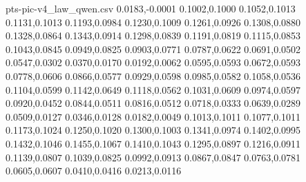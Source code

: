 \begin{filecontents*}[overwrite]{pts-pic-v4_law_qwen.csv}
0.0183,-0.0001
0.1002,0.1000
0.1052,0.1013
0.1131,0.1013
0.1193,0.0984
0.1230,0.1009
0.1261,0.0926
0.1308,0.0880
0.1328,0.0864
0.1343,0.0914
0.1298,0.0839
0.1191,0.0819
0.1115,0.0853
0.1043,0.0845
0.0949,0.0825
0.0903,0.0771
0.0787,0.0622
0.0691,0.0502
0.0547,0.0302
0.0370,0.0170
0.0192,0.0062
0.0595,0.0593
0.0672,0.0593
0.0778,0.0606
0.0866,0.0577
0.0929,0.0598
0.0985,0.0582
0.1058,0.0536
0.1104,0.0599
0.1142,0.0649
0.1118,0.0562
0.1031,0.0609
0.0974,0.0597
0.0920,0.0452
0.0844,0.0511
0.0816,0.0512
0.0718,0.0333
0.0639,0.0289
0.0509,0.0127
0.0346,0.0128
0.0182,0.0049
0.1013,0.1011
0.1077,0.1011
0.1173,0.1024
0.1250,0.1020
0.1300,0.1003
0.1341,0.0974
0.1402,0.0995
0.1432,0.1046
0.1455,0.1067
0.1410,0.1043
0.1295,0.0897
0.1216,0.0911
0.1139,0.0807
0.1039,0.0825
0.0992,0.0913
0.0867,0.0847
0.0763,0.0781
0.0605,0.0607
0.0410,0.0416
0.0213,0.0116
\end{filecontents*}
